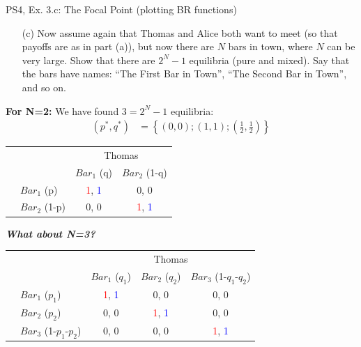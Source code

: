 \begin{frame}{PS4, Ex. 3.c: The Focal Point (plotting BR functions)}
    \begin{itemize}
      \item[(c)] Now assume again that Thomas and Alice both want to meet (so that payoffs are as in part (a)), but now there are $N$ bars in town, where $N$ can be very large. Show that there are $2^N-1$ equilibria (pure and mixed). Say that the bars have names: “The First Bar in Town”, “The Second Bar in Town”, and so on.
    \end{itemize}
  \begin{multicols}{2}
    \textbf{For N=2:} We have found $3=2^N-1$ equilibria:
    \begin{align*}
      (p^{*},q^{*})&=\left\{(0,0);(1,1);\left(\frac{1}{2},\frac{1}{2}\right)\right\}
    \end{align*}
  \vfill\null \columnbreak
    \vspace{-12pt}
    \begin{table}
      \begin{tabular}{cl|c|c|}
        & \multicolumn{1}{c}{} & \multicolumn{2}{c}{\color{blue}Thomas}\\
        \parbox[t]{1mm}{}
        &  &  &  \\
        & $Bar_1$ (p) & \textcolor{red}{1}, \textcolor{blue}{1} & 0, 0 \\
        & $Bar_2$ (1-p) & 0, 0 & \textcolor{red}{1}, \textcolor{blue}{1} \\
      \end{tabular}
    \end{table}
  \vfill\null
  \end{multicols}
    \textbf{\textit{What about N=3?}}
    \vspace{-12pt}
    \begin{table}
      \begin{tabular}{cl|c|c|c|}
        & \multicolumn{1}{c}{} & \multicolumn{3}{c}{\color{blue}Thomas}\\
        & \multicolumn{1}{c}{} & \multicolumn{1}{c}{$Bar_1$ ($q_1$)} & \multicolumn{1}{c}{$Bar_2$ ($q_2$)} & \multicolumn{1}{c}{$Bar_3$ (1-$q_1$-$q_2$)} \\\cline{3-5}
        \parbox[t]{1mm}{}
        & $Bar_1$ ($p_1$) & \textcolor{red}{1}, \textcolor{blue}{1} & 0, 0 & 0, 0 \\
        & $Bar_2$ ($p_2$) & 0, 0 & \textcolor{red}{1}, \textcolor{blue}{1} & 0, 0 \\
        & $Bar_3$ (1-$p_1$-$p_2$) & 0, 0 & 0, 0 & \textcolor{red}{1}, \textcolor{blue}{1} \\
      \end{tabular}
    \end{table}
  \vfill\null
\end{frame}
